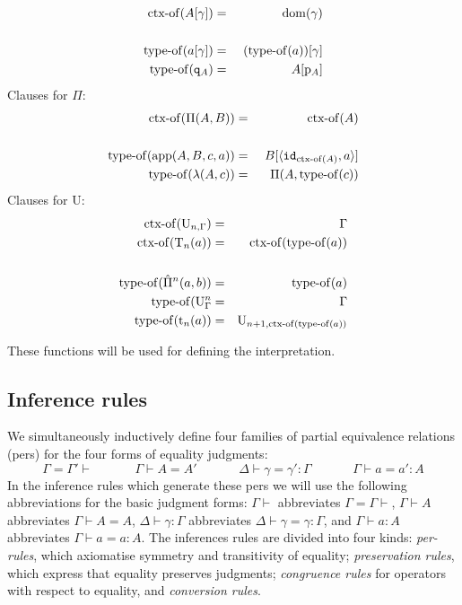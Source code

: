 \documentclass{lmcs}
\def\UU{\mathrm{U}}
\def\Ta{\mathrm{T}}
\def\Pihat{\hat{\Pi}}
\def\t{\mathrm{t}}
\begin{document}
\begin{eqnarray*}
\operatorname{ctx-of}(A[\gamma]) &=& \operatorname{dom}(\gamma)\\
&&\\
\operatorname{type-of}(a[\gamma]) &=&\ (\operatorname{type-of}(a))[\gamma]\\
\operatorname{type-of}({\tt q}_A) &=&\ A[\mathrm{p}_{A}]
\end{eqnarray*}
Clauses for $\Pi$:
\begin{eqnarray*}
\operatorname{ctx-of}(\Pi(A,B)) &=& \operatorname{ctx-of}(A)\\
&&\\
\operatorname{type-of}(\mathrm{app}(A,B,c,a)) &=&\ B[\langle {\tt id}_{\operatorname{ctx-of}(A)},a \rangle ]\\
\quad \operatorname{type-of}(\lambda(A,c)) &=& \Pi(A,\operatorname{type-of}(c))
\end{eqnarray*}
Clauses for $\UU$:
\begin{eqnarray*}
\ctxof(\UU_{n,\Gamma}) &=& \Gamma\\
\ctxof(\Ta_n(a)) &=& \ctxof(\typeof(a))\\
&&\\
\typeof(\Pihat^n(a,b))&=& \typeof(a)\\
\typeof(\UU^n_\Gamma &=& \Gamma\\
\typeof(\t_n(a)) &=& \UU_{n+1,\ctxof(\typeof(a))}
\end{eqnarray*}

These functions will be used for defining the interpretation.

\subsection{Inference rules}
We simultaneously inductively define four families of partial equivalence relations (pers) for the
four forms of equality judgments:
\[
\Gamma = \Gamma' \vdash \hspace{40pt} \Gamma \vdash A = A' \hspace{40pt}
\Delta \vdash \gamma = \gamma' : \Gamma \hspace{40pt} \Gamma \vdash a = a' : A
\]
In the inference rules which generate these pers we will use the following abbreviations for the basic judgment forms:
$\Gamma \vdash$ abbreviates $\Gamma = \Gamma \vdash$, 
$\Gamma \vdash A$ abbreviates $\Gamma \vdash A = A$,
$\Delta \vdash \gamma : \Gamma$ abbreviates  $\Delta \vdash \gamma = \gamma : \Gamma$, and 
$\Gamma \vdash a : A$ abbreviates $\Gamma \vdash a = a : A
$. The inferences rules are divided into four kinds: \emph{per-rules}, which axiomatise symmetry and
transitivity of equality; \emph{preservation rules}, which express that equality preserves
judgments; \emph{congruence rules} for operators with respect to equality, and \emph{conversion
rules}.
\end{document}
